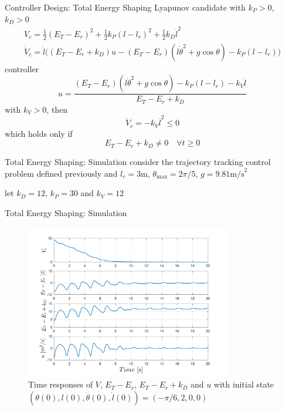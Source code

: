 \documentclass[10pt]{beamer}
\begin{document}
  \begin{frame}{Controller Design: Total Energy Shaping}
    Lyapunov candidate with $k_P>0$, $k_D>0$
    \begin{gather*}
      V_c = \frac{1}{2}(E_T-E_r)^2+\frac{1}{2}k_P(l-l_r)^2+
        \frac{1}{2}k_D\dot{l}^2 \\
      \dot{V}_c = \dot{l}\big((E_T-E_r+k_D)u-(E_T-E_r)(l\dot{\theta}^2+
        g\cos\theta)-k_P(l-l_r) \big)
    \end{gather*}
    controller
    \begin{equation*}
      u = \frac{(E_T-E_r)(l\dot{\theta}^2+g\cos\theta)-k_P(l-l_r)-
        k_V\dot{l}}{E_T-E_r+k_D}
    \end{equation*}
    with $k_V>0$, then
    \begin{equation*}
      \dot{V}_c = -k_V\dot{l}^2 \leq 0
    \end{equation*}
    which holds only if
    \begin{equation*}
      E_T-E_r+k_D  \neq 0 \quad \forall t\geq 0
    \end{equation*}
  \end{frame}

  \begin{frame}{Total Energy Shaping: Simulation}
    consider the trajectory tracking control problem defined previously
    and $l_r=3\text{m}$, $\theta_{\max}=2\pi/5$, $g=9.81\text{m/s}^2$
    
    \vspace{1cm}
    
    let $k_D=12$, $k_P=30$ and $k_V=12$
  \end{frame}

  \begin{frame}{Total Energy Shaping: Simulation}
    \begin{figure}
      \caption*{Time responses of $V$, $E_T-E_r$, $E_T-E_r+k_D$ and $u$
        with initial state
        $(\theta(0),l(0),\dot{\theta}(0),\dot{l}(0)) = (-\pi/6,2,0,0)$}
      \vspace{-0.3cm}
      \includegraphics[width=0.8\textwidth]{images/total_1b.pdf}
    \end{figure}
  \end{frame}
\end{document}
